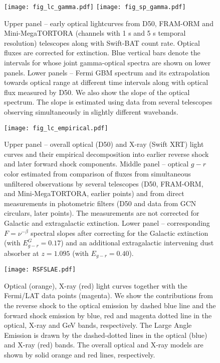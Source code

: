 \documentclass{naturesubmissionstyle}
\begin{document}
\begin{figure}
    \centering
    \texttt{[image: fig\_lc\_gamma.pdf]}
    \texttt{[image: fig\_sp\_gamma.pdf]}
    \caption{Upper panel -- early optical lightcurves from D50, FRAM-ORM and Mini-MegaTORTORA (channels with 1 s and 5 s temporal resolution) telescopes along with Swift-BAT count rate. Optical fluxes are corrected for extinction. Blue vertical bars denote the intervals for whose joint gamma-optical spectra are shown on lower panels. Lower panels -- Fermi GBM spectrum and its extrapolation towards optical range at different time intervals along with optical flux measured by D50. 
    We also show the slope of the optical spectrum. The slope is estimated using data from several telescopes observing simultaneously in slightly different wavebands.
    }
    \label{fig:gamma_opt}
\end{figure}

\newpage 

\begin{figure}
    \centering
    \texttt{[image: fig\_lc\_empirical.pdf]}
    \caption{Upper panel -- overall optical (D50) and X-ray (Swift XRT) light curves and their empirical decomposition into earlier reverse shock and later forward shock components. Middle panel -- optical $g-r$ color estimated from comparison of fluxes from simultaneous unfiltered observations by several telescopes (D50, FRAM-ORM, and Mini-MegaTORTORA, earlier points) and from direct measurements in photometric filters (D50 and data from GCN circulars, later points). The measurements are not corrected for Galactic and extragalactic extinction. Lower panel -- corresponding $F=\nu^{-\beta}$ spectral slopes after correcting for the Galactic extinction (with $E_{g-r}^G=0.17$) and an additional extragalactic intervening dust absorber at $z=1.095$ (with $E_{g-r}=0.40$).}
    \label{fig:lc}
\end{figure}



\newpage 

\begin{figure}
    \centering
    \texttt{[image: RSFSLAE.pdf]}
    \caption{Optical (orange), X-ray (red) light curves together with the Fermi/LAT data points (magenta). We show the contributions from the reverse shock to the optical emission by dashed blue line and the forward shock emission by blue, red and magenta dotted line in the optical, X-ray and GeV bands, respectively. The Large Angle Emission is drawn by the dashed-dotted lines in the optical (blue) and X-ray (red) bands. The overall optical and X-ray models are shown by solid orange and red lines, respectively.}
    \label{fig:model}
\end{figure}
\end{document}
